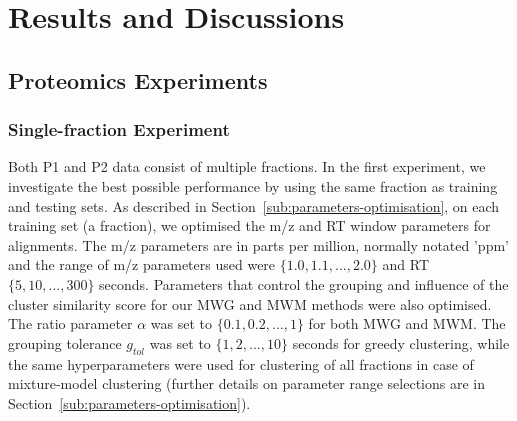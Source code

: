 \section{Results and Discussions}

\subsection{Proteomics Experiments}
\label{sub:Proteomics-experiments}

\subsubsection{Single-fraction Experiment}

Both P1 and P2 data consist of multiple fractions. In the first experiment, we investigate the best possible performance by using the same fraction as training and testing sets. As described in Section~\ref{sub:parameters-optimisation}, on each training set (a fraction), we optimised the m/z and RT window parameters for alignments. The m/z parameters are in parts per million, normally notated 'ppm' and the range of m/z parameters used were $\{1.0,1.1,...,2.0\}$ and RT $\{5,10,...,300\}$ seconds. Parameters that control the grouping and influence of the cluster similarity score for our MWG and MWM methods were also optimised. The ratio parameter $\alpha$ was set to $\{0.1,0.2,...,1\}$ for both MWG and MWM. The grouping tolerance $g_{tol}$ was set to $\{1,2,...,10\}$ seconds for greedy clustering, while the same hyperparameters were used for clustering of all fractions in case of mixture-model clustering (further details on parameter range selections are in Section~\ref{sub:parameters-optimisation}). 

